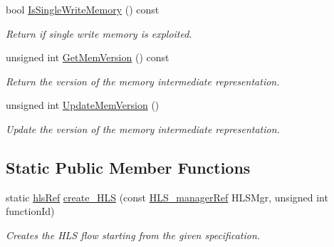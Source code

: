 \begin{DoxyCompactItemize}
bool \hyperlink{classHLS__manager_a022c7d48031f428b5814d0493ac46d1e}{Is\+Single\+Write\+Memory} () const
\begin{DoxyCompactList}\small\item\em Return if single write memory is exploited. \end{DoxyCompactList}\item 
unsigned int \hyperlink{classHLS__manager_a1ec303c0c29f40a1e9faa003fc71d8ed}{Get\+Mem\+Version} () const
\begin{DoxyCompactList}\small\item\em Return the version of the memory intermediate representation. \end{DoxyCompactList}\item 
unsigned int \hyperlink{classHLS__manager_a7503f3dcbbb837cd94ad7052bdfb189a}{Update\+Mem\+Version} ()
\begin{DoxyCompactList}\small\item\em Update the version of the memory intermediate representation. \end{DoxyCompactList}\end{DoxyCompactItemize}
\subsection*{Static Public Member Functions}
\begin{DoxyCompactItemize}
\item 
static \hyperlink{hls_8hpp_a75d0c73923d0ddfa28c4843a802c73a7}{hls\+Ref} \hyperlink{classHLS__manager_a0b8d2323f8e04cfe68b27e5ec8c4566c}{create\+\_\+\+H\+LS} (const \hyperlink{hls__manager_8hpp_acd3842b8589fe52c08fc0b2fcc813bfe}{H\+L\+S\+\_\+manager\+Ref} H\+L\+S\+Mgr, unsigned int function\+Id)
\begin{DoxyCompactList}\small\item\em Creates the H\+LS flow starting from the given specification. \end{DoxyCompactList}\end{DoxyCompactItemize}
